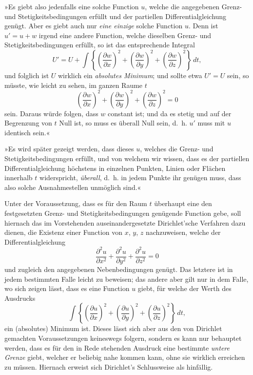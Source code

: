 \documentclass{article}
\begin{document}
»Es giebt also jedenfalls eine solche Function $u$, welche die angegebenen Grenz- und Stetigkeitsbedingungen erfüllt und der partiellen Differentialgleichung genügt. Aber es giebt auch nur \emph{eine einzige} solche Function $u$. Denn ist $u' = u+w$ irgend eine andere Function, welche dieselben Grenz- und Stetigkeitsbedingungen erfüllt, so ist das entsprechende Integral
\[
U' = U + \int\left\{\left(\frac{\partial w}{\partial x}\right)^{2} + \left(\frac{\partial w}{\partial y}\right)^{2} + \left(\frac{\partial w}{\partial z}\right)^{2}\right\}\,dt,
\]
und folglich ist $U$ wirklich ein \emph{absolutes Minimum}; und sollte etwa $U' = U$ sein, so müsste, wie leicht zu sehen, im ganzen Raume $t$
\[
\left(\frac{\partial w}{\partial x}\right)^{2} + \left(\frac{\partial w}{\partial y}\right)^{2} + \left(\frac{\partial w}{\partial z}\right)^{2} = 0
\]
sein. Daraus würde folgen, dass $w$ constant ist; und da es stetig und auf
der Begrenzung von $t$ Null ist, so muss es überall Null sein, d.\ h. $u'$ muss mit $u$ identisch sein.«

»Es wird später gezeigt werden, dass dieses $u$, welches die Grenz- und Stetigkeitsbedingungen erfüllt, und von welchem wir wissen, dass es der partiellen Differentialgleichung höchstens in einzelnen Punkten, Linien oder Flächen innerhalb $t$ widerspricht, \emph{überall}, d.\ h. in jedem Punkte ihr genügen muss, dass also solche Ausnahmestellen unmöglich sind.«

Unter der Voraussetzung, dass es für den Raum $t$ überhaupt eine den festgesetzten Grenz- und Stetigkeitsbedingungen genügende Function gebe, soll hiernach das im Vorstehenden auseinandergesetzte Dirichlet’sche Verfahren dazu dienen, die Existenz einer Function von $x$, $y$, $z$ nachzuweisen, welche der Differentialgleichung
\[
\frac{\partial^{2} u}{\partial x^{2}} + \frac{\partial^{2} u}{\partial y^{2}} + \frac{\partial^{2} u}{\partial z^{2}} = 0
\]
und zugleich den angegebenen Nebenbedingungen genügt. Das letztere ist in jedem bestimmten Falle leicht zu beweisen; das andere aber gilt nur in dem Falle, wo sich zeigen lässt, dass es eine Function $u$ giebt, für welche der Werth des Ausdrucks
\[
\int \left\{ \left(\frac{\partial u}{\partial x}\right)^{2} + \left(\frac{\partial u}{\partial y}\right)^{2} + \left(\frac{\partial u}{\partial z}\right)^{2} \right\} \,dt,
\]
ein (absolutes) Minimum ist. Dieses lässt sich aber aus den von Dirichlet gemachten Voraussetzungen keineswegs folgern, sondern es kann nur behauptet werden, dass es für den in Rede stehenden Ausdruck eine bestimmte \emph{untere Grenze} giebt, welcher er beliebig nahe kommen kann, ohne sie wirklich erreichen zu müssen. Hiernach erweist sich Dirichlet’s Schlussweise als hinfällig.
\end{document}
